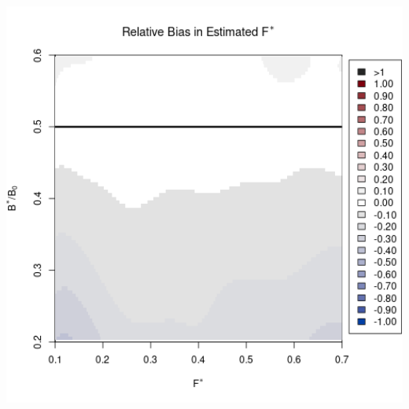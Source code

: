 \documentclass[ xcolor = pdftex, dvipsnames, table ]{beamer}
\begin{document}
\begin{frame}
\begin{minipage}[h!]{0.325\textwidth}
\hspace*{0.25cm}
\includegraphics[width=1.1\textwidth]{../../.././nick/gpBias/fMSYRelBiasPellaExpT90.png}
\end{minipage}
\end{frame}


%
\end{document}
